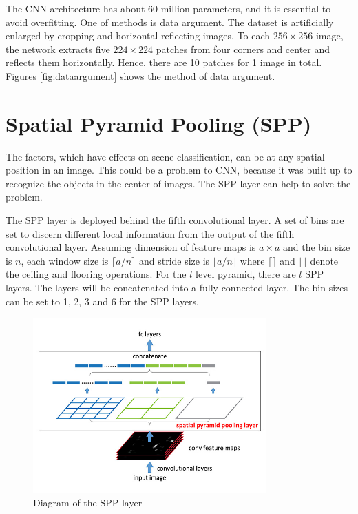 The CNN architecture\citep{krizhevsky2012imagenet} has about 60 million parameters, and it is essential to avoid overfitting. One of methods is data argument. The dataset is artificially enlarged by cropping and horizontal reflecting images. To each $256\times256$ image, the network extracts five $224\times224$ patches from four corners and center and reflects them horizontally. Hence, there are 10 patches for 1 image in total. Figures \ref{fig:dataargument} shows the method of data argument.

\section{Spatial Pyramid Pooling (SPP)}

The factors, which have effects on scene classification, can be at any spatial position in an image. This could be a problem to CNN, because it was built up to recognize the objects in the center of images. The SPP layer can help to solve the problem.

The SPP layer is deployed behind the fifth convolutional layer. A set of bins are set to discern different local information from the output of the fifth convolutional layer. Assuming dimension of feature maps is $a\times a$ and the bin size is $n$, each window size is $\lceil a/n \rceil$ and stride size is $\lfloor a/n \rfloor$ where $\lceil  \rceil$ and $\lfloor  \rfloor$ denote the ceiling and flooring operations. For the $l$ level pyramid, there are $l$ SPP layers. The layers will be concatenated into a fully connected layer. The bin sizes can be set to 1, 2, 3 and 6 for the SPP layers.

\begin{figure}[htb]
    \centering
	\includegraphics[width=0.8\textwidth]{sppnet.jpg}
    \caption{Diagram of the SPP layer\citep{he2014spatial}}%
    \label{fig:sppnet}%
\end{figure}

